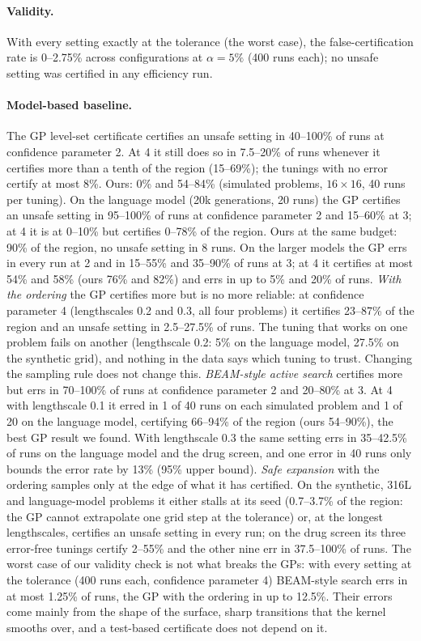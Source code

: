 \documentclass{article}
\begin{document}
\paragraph{Validity.} With every setting exactly at the tolerance (the
worst case), the false-certification rate is 0--2.75\% across
configurations at $\alpha=5\%$ (400 runs each); no unsafe setting was
certified in any efficiency run.

\paragraph{Model-based baseline.} The GP level-set certificate certifies an
unsafe setting in 40--100\% of runs at confidence parameter 2. At 4 it
still does so in 7.5--20\% of runs whenever it certifies more than a
tenth of the region (15--69\%); the tunings with no error certify at most
8\%. Ours: 0\% and 54--84\% (simulated problems, $16\times16$, 40 runs
per tuning). On the language
model (20k generations, 20 runs) the GP certifies an unsafe setting in
95--100\% of runs at confidence parameter 2 and 15--60\% at 3; at 4 it is
at 0--10\% but certifies 0--78\% of the region. Ours at the same budget:
90\% of the region, no unsafe setting in 8 runs. On the larger models the
GP errs in every run at 2 and in 15--55\% and 35--90\% of runs at 3; at 4
it certifies at most 54\% and 58\% (ours 76\% and 82\%) and errs in up
to 5\% and 20\% of runs. \emph{With the ordering}
the GP certifies more but is no more reliable: at confidence parameter 4
(lengthscales 0.2 and 0.3, all four problems) it certifies 23--87\% of the
region and an unsafe setting in 2.5--27.5\% of runs. The tuning that
works on one problem fails on another (lengthscale 0.2: 5\% on the
language model, 27.5\% on the synthetic grid), and nothing in the data
says which tuning to trust. Changing the sampling rule does not change
this. \emph{BEAM-style active search} certifies more but errs in
70--100\% of runs at confidence parameter 2 and 20--80\% at 3. At 4
with lengthscale 0.1 it erred in 1 of 40 runs on each simulated problem
and 1 of 20 on the language model, certifying 66--94\% of the region
(ours 54--90\%), the best GP result we found. With lengthscale 0.3 the
same setting errs in 35--42.5\% of runs on the language model and the
drug screen, and one error in 40 runs only bounds the error rate by 13\%
(95\% upper bound). \emph{Safe expansion} with the ordering samples
only at the edge of what it has certified. On the synthetic, 316L and
language-model problems it either stalls at its seed (0.7--3.7\% of the
region: the GP cannot extrapolate one grid step at the tolerance) or, at
the longest lengthscales, certifies an unsafe setting in every run; on
the drug screen its three error-free tunings certify 2--55\% and the
other nine err in 37.5--100\% of runs. The worst case of our validity
check is not what breaks the GPs: with every setting at the tolerance
(400 runs each, confidence parameter 4) BEAM-style search errs in at most
1.25\% of runs, the GP with the ordering in up to 12.5\%. Their errors
come mainly from the shape of the surface, sharp transitions that the
kernel smooths over, and a test-based certificate does not depend on it.
\end{document}
